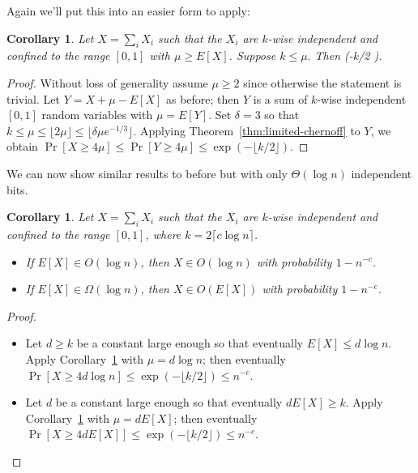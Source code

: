 \documentclass[11pt,a4paper]{article}
\newtheorem{corollary}[theorem]{Corollary}
\def\[#1\]{\begin{align*}#1\end{align*}}
\begin{document}
Again we'll put this into an easier form to apply:

\begin{tcolorbox}
  \begin{corollary}
    \label{cor:limited-chernoff-simple}
    Let \(X = \sum_i X_i\) such that the \(X_i\) are \(k\)-wise independent and confined to the range \([0, 1]\) with \(\mu \ge E[X]\).
    Suppose \(k \le \mu.\)
    Then \[\Pr[X \ge 4\mu] \le \exp(-\lfloor k/2 \rfloor).\]
  \end{corollary}
\end{tcolorbox}
\begin{proof}
  Without loss of generality assume \(\mu \ge 2\) since otherwise the statement is trivial.
  Let \(Y = X + \mu - E[X]\) as before; then \(Y\) is a sum of \(k\)-wise independent \([0, 1]\) random variables with \(\mu = E[Y]\).
  Set \(\delta = 3\) so that \(k \le \mu \le \lfloor 2\mu \rfloor \le \lfloor \delta \mu e^{-1/3} \rfloor\).
  Applying Theorem~\ref{thm:limited-chernoff} to \(Y\), we obtain
  \(\Pr[X \ge 4\mu] \le \Pr[Y \ge 4\mu] \le \exp(-\lfloor k/2 \rfloor).\)
\end{proof}

We can now show similar results to before but with only \(\Theta(\log n)\) independent bits.

\begin{tcolorbox}
  \begin{corollary}
    Let \(X = \sum_i X_i\) such that the \(X_i\) are \(k\)-wise independent and confined to the range \([0, 1]\), where \(k = 2\lceil c\log n \rceil\).
    \begin{itemize}
    \item If \(E[X] \in O(\log n)\), then  \(X \in O(\log n)\) with probability \(1 - n^{-c}\).
    \item If \(E[X] \in \Omega(\log n)\), then \(X \in O(E[X])\) with probability \(1 - n^{-c}\).
    \end{itemize}
  \end{corollary}
\end{tcolorbox}
\begin{proof}\hfill
  \begin{itemize}
  \item
    Let \(d \ge k\) be a constant large enough so that eventually \(E[X] \le d \log n\).
    Apply Corollary~\ref{cor:limited-chernoff-simple} with \(\mu = d \log n\); 
    then eventually \(\Pr[X \ge 4d \log n] \le \exp(-\lfloor k/2 \rfloor) \le n^{-c}\).
  \item
    Let \(d\) be a constant large enough so that eventually \(d E[X] \ge k\).
    Apply Corollary~\ref{cor:limited-chernoff-simple} with \(\mu = dE[X]\);
    then eventually \(\Pr[X \ge 4dE[X]] \le \exp(-\lfloor k/2 \rfloor) \le n^{-c}\).
  \end{itemize}
\end{proof}
\end{document}
